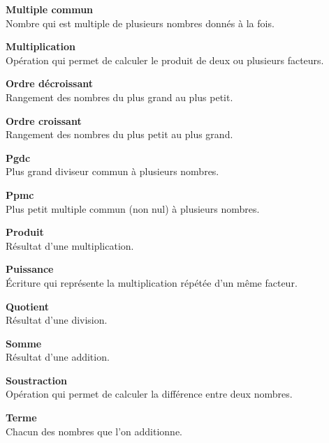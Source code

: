 \begin{tcbraster}[raster columns=2, raster equal height, raster valign=top,raster column skip=2mm, raster row skip=2mm]
\begin{terme}
\textbf{\large Multiple commun}\\[2pt]
{\small Nombre qui est multiple de plusieurs nombres donnés à la fois.}
\end{terme}
\begin{terme}
\textbf{\large Multiplication}\\[2pt]
{\small Opération qui permet de calculer le produit de deux ou plusieurs facteurs.}
\end{terme}
\begin{terme}
\textbf{\large Ordre décroissant}\\[2pt]
{\small Rangement des nombres du plus grand au plus petit.}
\end{terme}
\begin{terme}
\textbf{\large Ordre croissant}\\[2pt]
{\small Rangement des nombres du plus petit au plus grand.}
\end{terme}
\begin{terme}
\textbf{\large Pgdc}\\[2pt]
{\small Plus grand diviseur commun à plusieurs nombres.}
\end{terme}
\begin{terme}
\textbf{\large Ppmc}\\[2pt]
{\small Plus petit multiple commun (non nul) à plusieurs nombres.}
\end{terme}
\begin{terme}
\textbf{\large Produit}\\[2pt]
{\small Résultat d'une multiplication.}
\end{terme}
\begin{terme}
\textbf{\large Puissance}\\[2pt]
{\small Écriture qui représente la multiplication répétée d'un même facteur.}
\end{terme}
\begin{terme}
\textbf{\large Quotient}\\[2pt]
{\small Résultat d'une division.}
\end{terme}
\begin{terme}
\textbf{\large Somme}\\[2pt]
{\small Résultat d'une addition.}
\end{terme}
\begin{terme}
\textbf{\large Soustraction}\\[2pt]
{\small Opération qui permet de calculer la différence entre deux nombres.}
\end{terme}
\begin{terme}
\textbf{\large Terme}\\[2pt]
{\small Chacun des nombres que l'on additionne.}
\end{terme}
\end{tcbraster}
